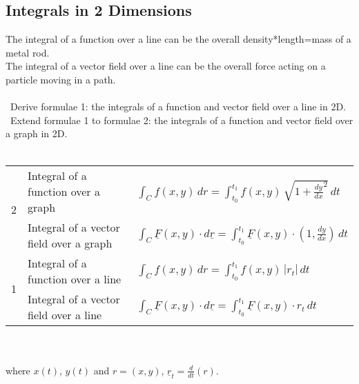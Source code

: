 \documentclass{article}
\begin{document}
		\subsection{Integrals in 2 Dimensions}
			The integral of a function over a line can be the overall density*length=mass of a metal rod. \\
			The integral of a vector field over a line can be the overall force acting on a particle moving in a path. \\
			\\
			\textbullet\ Derive formulae 1: the integrals of a function and vector field over a line in 2D. \\
			\textbullet\ Extend formulae 1 to formulae 2: the integrals of a function and vector field over a graph in 2D. \\
			\\
			\begin{tabular}{| c | l | l |}
			\hline
			\multirow{2}{*}{2}	& Integral of a function over a graph		& $\int_{C} f(x,y) \,dr = \int_{t_{0}}^{t_{1}} f(x,y) \,\sqrt{1+\frac{dy}{dx}^2} \,dt$ \\
								\cline{2-3}
								& Integral of a vector field over a graph	& $\int_{C} \underline{F}(x,y) \cdot d\underline{r} = \int_{t_{0}}^{t_{1}} \underline{F}(x,y) \cdot (1, \frac{dy}{dx}) \,dt$ \\
			\hline\hline
			\multirow{2}{*}{1}	& Integral of a function over a line		& $\int_{C} f(x,y) \,dr = \int_{t_{0}}^{t_{1}} f(x,y) \,|r_{t}| \,dt$ \\
								\cline{2-3}
								& Integral of a vector field over a line	& $\int_{C} \underline{F}(x,y) \cdot d\underline{r} = \int_{t_{0}}^{t_{1}} \underline{F}(x,y) \cdot r_{t} \,dt$ \\
			\hline
			\end{tabular} \\
			\\
			where $x(t)$, $y(t)$ and $r=(x,y)$, $\underline{r}_{t} = \frac{d}{dt}(r)$. \\
	
\end{document}
